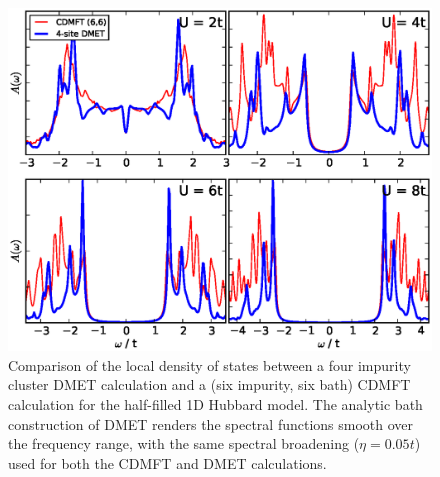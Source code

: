 \documentclass[aps,showpacs,twocolumn,nobibnotes]{revtex4}
\begin{document}
\begin{figure}
\begin{center}
    \vspace{-2mm}
\includegraphics[scale=0.475]{Plots/1D_Spectra/1D_Hub_Spectra.eps}
\end{center}
    \vspace{-5mm}
\caption{Comparison of the local density of states between a four impurity cluster DMET calculation and a
(six impurity, six bath) CDMFT calculation for the half-filled 1D Hubbard model. The analytic bath construction
of DMET renders the spectral functions smooth over the frequency range, with the same spectral broadening ($\eta=0.05t$) used for
both the CDMFT and DMET calculations.}
\label{1D_DOS}
\end{figure}
\end{document}
